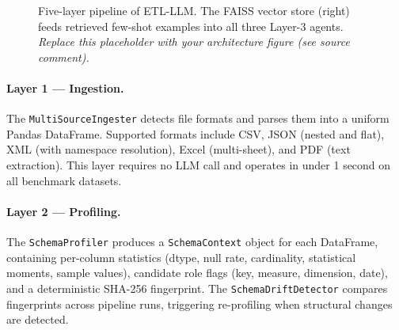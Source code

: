 \documentclass[9pt,a4paper,twocolumn,twoside]{rho-class/rho}
\begin{document}
    \begin{figure}[H]
        \centering
        \caption{Five-layer pipeline of \textsc{ETL-LLM}. The FAISS vector store (right) feeds retrieved few-shot examples into all three Layer-3 agents. \textit{Replace this placeholder with your architecture figure (see source comment).}}
        \label{fig:architecture}
    \end{figure}

    \paragraph{Layer 1 — Ingestion.}
    The \texttt{MultiSourceIngester} detects file formats and parses them into a uniform Pandas DataFrame. Supported formats include CSV, JSON (nested and flat), XML (with namespace resolution), Excel (multi-sheet), and PDF (text extraction). This layer requires no LLM call and operates in under 1 second on all benchmark datasets.

    \paragraph{Layer 2 — Profiling.}
    The \texttt{SchemaProfiler} produces a \texttt{SchemaContext} object for each DataFrame, containing per-column statistics (dtype, null rate, cardinality, statistical moments, sample values), candidate role flags (key, measure, dimension, date), and a deterministic SHA-256 fingerprint. The \texttt{SchemaDriftDetector} compares fingerprints across pipeline runs, triggering re-profiling when structural changes are detected.
\end{document}
